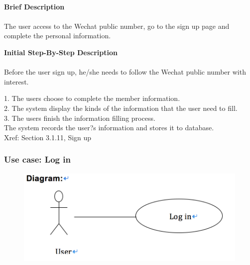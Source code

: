 \documentclass[12pt]{report}
\begin{document}
\paragraph{}
\begin{flushleft}
\textbf{Brief Description }
\paragraph{}
The user access to the Wechat public number, go to the sign up page and complete the personal information.\\

\begin{flushleft}
\textbf{Initial Step-By-Step Description }
\paragraph{}
Before the user sign up, he/she needs to follow the Wechat public number with interest.

\begin{flushleft}
1.	The users choose to complete the member information. \\
2.	The system display the kinds of the information that the user need to fill. \\
3.	The users finish the information filling process. \\
The system records the user?s information and stores it to database. \\
Xref: Section 3.1.11, Sign up

\end{flushleft}
\end{flushleft}
\end{flushleft}


\newpage
\subsubsection{Use case:  Log in }

\begin{figure}[!htb]
  \includegraphics{12.PNG}
\end{figure}
\end{document}
